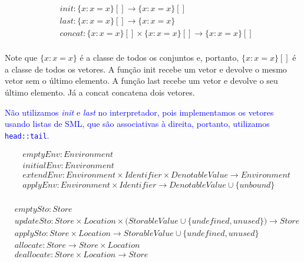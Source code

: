 \documentclass[12pt]{article}
\newcommand{\blu}{\textcolor{blue}}
\begin{document}
\begin{align*}
&init:\{x: x = x\}[] \rightarrow \{x: x = x\}[] \\
&last:\{x: x = x\}[] \rightarrow \{x: x = x\} \\
&concat:\{x: x = x\}[] \times \{x: x = x\}[] \rightarrow \{x : x = x\}[] \\
\end{align*}

Note que $\{x: x = x\}$ é a classe de todos os conjuntos e, portanto, $\{x: x = x\}[]$ é a classe de todos os vetores. A função init recebe um vetor e devolve o mesmo vetor sem o último elemento. A função last recebe um vetor e devolve o seu último elemento. Já a concat concatena dois vetores.

\blu{Não utilizamos \textit{init} e \textit{last} no interpretador, pois implementamos os vetores usando listas de SML, que são associativas à direita, portanto, utilizamos \texttt{head::tail}.}

\begin{align*}
&emptyEnv:Environment \\
&initialEnv:Environment\\
&extendEnv:Environment\times Identifier\times DenotableValue\to Environment \\
&applyEnv:Environment\times Identifier\to DenotableValue\cup \{unbound\} \\
\end{align*}

\begin{align*}
&emptySto:Store \\
&updateSto:Store\times Location \times \big(StorableValue \cup \{undefined, unused\}\big) \to Store \\
&applySto:Store\times Location \to StorableValue\cup \{undefined, unused\} \\
&allocate:Store\to Store\times Location \\
&deallocate:Store\times Location \to Store \\
\end{align*}
\end{document}
